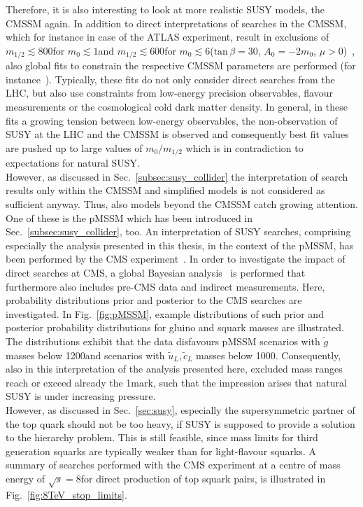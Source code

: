 Therefore, it is also interesting to look at more realistic SUSY models, \eg the CMSSM again. In addition to direct interpretations of searches in the CMSSM, which for instance in case of the ATLAS experiment, result in exclusions of $m_{1/2} \lesssim 800$\gev for $m_{0} \lesssim 1$\tev and $m_{1/2} \lesssim 600$\gev for $m_{0} \lesssim 6$\tev ($\mathrm{tan} \, \beta = 30$, $A_0 = -2m_0$, $\mu >0$)~\cite{bib:ATLAS:PhysicsResultsSUS}, also global fits to constrain the respective CMSSM parameters are performed (\cf for instance~\cite{Bechtle:2012zk, Buchmueller:2013rsa}). Typically, these fits do not only consider direct searches from the LHC, but also use constraints from low-energy precision observables, flavour measurements or the cosmological cold dark matter density. In general, in these fits a growing tension between low-energy observables, the non-observation of SUSY at the LHC and the CMSSM is observed and consequently best fit values are pushed up to large values of $m_0/m_{1/2}$ which is in contradiction to expectations for natural SUSY. \\
However, as discussed in Sec.~\ref{subsec:susy_collider} the interpretation of search results only within the CMSSM and simplified models is not considered as sufficient anyway. Thus, also models beyond the CMSSM catch growing attention. One of these is the pMSSM which has been introduced in Sec.~\ref{subsec:susy_collider}, too. An interpretation of SUSY searches, comprising especially the analysis presented in this thesis, in the context of the pMSSM, has been performed by the CMS experiment~\cite{CMS-PAS-SUS-13-020}. In order to investigate the impact of direct searches at CMS, a global Bayesian analysis~\cite{robert2001bayesian, o2004bayesian} is performed that furthermore also includes pre-CMS data and indirect measurements. Here, probability distributions prior and posterior to the CMS searches are investigated. In Fig.~\ref{fig:pMSSM}, example distributions of such prior and posterior probability distributions for gluino and squark masses are illustrated. The distributions exhibit that the data disfavours pMSSM scenarios with $\tilde{g}$ masses below 1200\gev and scenarios with $\tilde{u}_L,\tilde{c}_L$ masses below 1000\gev. Consequently, also in this interpretation of the analysis presented here, excluded mass ranges reach or exceed already the 1\tev mark, such that the impression arises that natural SUSY is under increasing pressure. \\
However, as discussed in Sec.~\ref{sec:susy}, especially the supersymmetric partner of the top quark should not be too heavy, if SUSY is supposed to provide a solution to the hierarchy problem. This is still feasible, since mass limits for third generation squarks are typically weaker than for light-flavour squarks. A summary of searches performed with the CMS experiment at a centre of mass energy of $\sqrt{s} = 8$\tev for direct production of top squark pairs, is illustrated in Fig.~\ref{fig:8TeV_stop_limits}.
